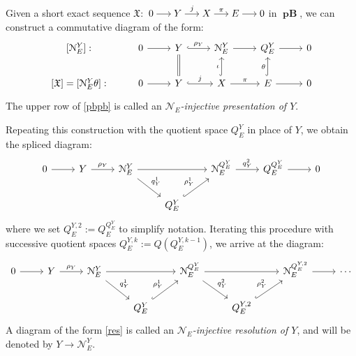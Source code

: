 \documentclass[12pt,a4paper]{amsproc}
\theoremstyle{remark}
\theoremstyle{definition}
\newcommand{\pBan}{\operatorname{\textbf{pB}}}
\numberwithin{equation}{section}
\begin{document}
\par Given a short exact sequence $\mathfrak{X}:$
$\begin{tikzcd}[cramped, column sep=1.5em]
	0 \arrow[r] & Y \arrow[r, "j"] & X \arrow[r, "\pi"] & E \arrow[r] & 0
\end{tikzcd}$
in $\boldsymbol{\pBan}$, we can construct a commutative diagram of the form:
\begin{equation}\label{pbpb}
	\begin{tikzcd}
		{[\mathcal{N}_E^Y]}: & 0 \arrow[r] & Y \arrow[r, "{\rho_Y}", hook] & {\mathcal{N}_E^Y} \arrow[r] & {Q_E^Y} \arrow[r] & 0 \\
		{[\mathfrak{X}]=[\mathcal{N}_E^Y \theta]}: & 0 \arrow[r] & Y \arrow[r, "j", hook] \arrow[u, equal] & X \arrow[r, "\pi"] \arrow[u, "\iota", hook] & E \arrow[r] \arrow[u, "\theta", hook] & 0
	\end{tikzcd}
\end{equation}
The upper row of \eqref{pbpb} is called an \emph{$\mathcal{N}_E$-injective presentation of $Y$}.

Repeating this construction with the quotient space $Q_E^Y$ in place of $Y$, we obtain the spliced diagram:
\begin{equation}\notag
	\begin{tikzcd}
		0 \arrow[r] & Y \arrow[r, "\rho_Y"] & \mathcal{N}_E^Y \arrow[rd, "q^1_{Y}"] \arrow[rr] & & \mathcal{N}_E^{Q_E^Y} \arrow[r, "q_Y^2"] & Q_E^{Q_E^Y} \arrow[r] & 0 \\
		& & & Q_E^Y \arrow[ru, "\rho_Y^1", hook] & & &
	\end{tikzcd}
\end{equation}
where we set $Q_E^{Y,2} := Q_E^{Q_E^Y}$ to simplify notation. Iterating this procedure with successive quotient spaces $Q_E^{Y,k} := Q(Q_E^{Y,k-1})$, we arrive at the diagram:
\begin{equation}\label{res}
	\begin{tikzcd}
		0 \arrow[r] & Y \arrow[r, "\rho_Y"] & {\mathcal{N}_E^Y} \arrow[rd, "q_Y^1"] \arrow[rr] & & {\mathcal{N}_E^{Q_E^Y}} \arrow[rd, "q_Y^2"] \arrow[rr] & & {\mathcal{N}_E^{Q_E^{Y,2}}} \arrow[r] & \cdots \\
		& & & {Q_E^Y} \arrow[ru, "\rho_Y^1", hook] & & {Q_E^{Y,2}} \arrow[ru, "\rho_Y^2", hook] & &
	\end{tikzcd}
\end{equation}
A diagram of the form \eqref{res} is called an \emph{$\mathcal{N}_E$-injective resolution of $Y$}, and will be denoted by $Y \to \mathcal{N}_E^Y$.
\end{document}
